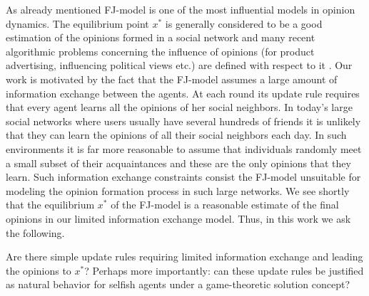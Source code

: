 As already mentioned FJ-model is one of the most influential models in opinion
dynamics. The equilibrium point $x^*$ is generally considered to be a good
estimation of the opinions formed in a social network and many recent algorithmic
problems concerning the influence of opinions (for product advertising,
influencing political views etc.) are defined with respect to it
\cite{GTT13,AKPT18}.
Our work is motivated by the fact that the FJ-model assumes a large amount of
information exchange between the agents. At each round its update rule requires
that every agent learns all the opinions of her social neighbors.  In today's
large social networks where users usually have several hundreds of friends it
is unlikely that they can learn the opinions of all their social neighbors each
day.
In such environments it is far more reasonable to assume that individuals randomly
meet a small subset of their acquaintances and these are the only opinions that
they learn.  Such information exchange constraints consist the FJ-model
unsuitable for modeling the opinion formation process in such large networks.
We see shortly that the equilibrium $x^*$ of the FJ-model is a reasonable
estimate of the final opinions in our limited information exchange model.
Thus, in this work we ask the following.
\begin{question}\label{q:motivation1}
Are there simple update rules requiring limited information
exchange and leading the opinions to $x^*$? Perhaps more importantly:
can these update rules be justified as natural behavior for selfish
agents under a game-theoretic solution concept?
\end{question}

